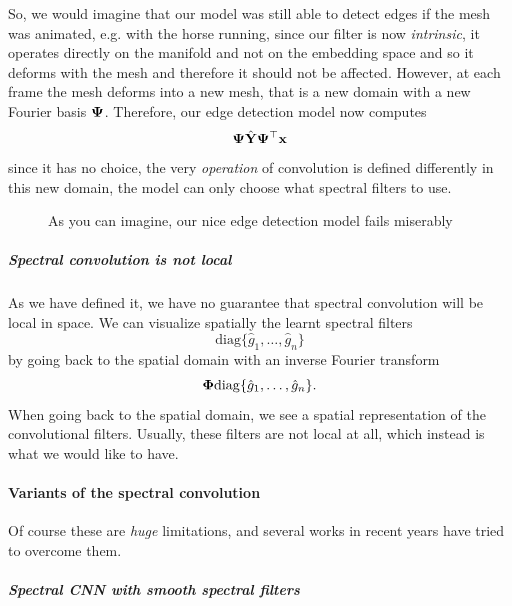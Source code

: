 So, we would imagine that our model was still able to detect edges if the mesh was animated, e.g. with the horse running, since our filter is now \emph{intrinsic}, it operates directly on the manifold and not on the embedding space and so it deforms with the mesh and therefore it should not be affected. However, at each frame the mesh deforms into a new mesh, that is a new domain with a new Fourier basis $\vb*{\Psi}$. Therefore, our edge detection model now computes
\begin{equation}
    \vb*{\Psi} \hat{\vb{Y}}  \vb*{\Psi}^{\top} \vb{x}
\end{equation}
since it has no choice, the very \emph{operation} of convolution is defined differently in this new domain, the model can only choose what spectral filters to use.

\begin{figure}[H]
    \centering
    \caption{As you can imagine, our nice edge detection model fails miserably}
\end{figure}

\subparagraph{Spectral convolution is not local}

As we have defined it, we have no guarantee that spectral convolution will be local in space. We can visualize spatially the learnt spectral filters
\begin{equation}
    \mathrm{diag} \{ \hat{g}_1, \dots, \hat{g}_n \}
\end{equation}
by going back to the spatial domain with an inverse Fourier transform
\begin{equation}
    \vb*{\Phi} \mathrm{diag} \{ \hat{g}_1, \dots, \hat{g}_n \}.
\end{equation}
When going back to the spatial domain, we see a spatial representation of the convolutional filters. Usually, these filters are not local at all, which instead is what we would like to have.

\paragraph{Variants of the spectral convolution}

Of course these are \emph{huge} limitations, and several works in recent years have tried to overcome them.

\subparagraph{Spectral CNN with smooth spectral filters}

